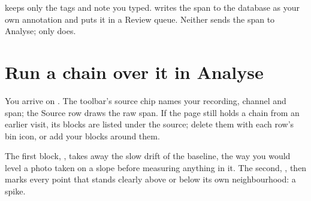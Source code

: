 
\begin{watchout}
 keeps only the tags and note you typed.  writes the
span to the database as your own annotation and puts it in a Review queue. Neither sends the
span to Analyse; only  does.
\end{watchout}

\section{Run a chain over it in Analyse}\label{sec:first-session-analyse}
You arrive on . The toolbar's source chip names your recording,
channel and span; the \textsf{Source} row draws the raw span. If the page still holds a
chain from an earlier visit, its blocks are listed under the source; delete them with each
row's bin icon, or add your blocks around them.

\begin{plainterms}
The first block, , takes away the slow drift of the
baseline, the way you would level a photo taken on a slope before measuring anything in it.
The second, , then marks every point that stands clearly above
or below its own neighbourhood: a spike.
\end{plainterms}


